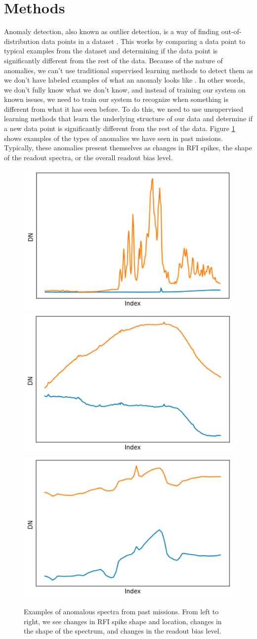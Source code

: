 \section{Methods}
\label{spectra/sec:methods}
Anomaly detection, also known as outlier detection, is a way of finding out-of-distribution data points in a dataset \parencite{kerner2022domain}.
This works by comparing a data point to typical examples from the dataset and determining if the data point is significantly different from the rest of the data.
Because of the nature of anomalies, we can't use traditional supervised learning methods to detect them as we don't have labeled examples of what an anomaly looks like \parencite{horton2021integrating}.
In other words, we don't fully know what we don't know, and instead of training our system on known issues, we need to train our system to recognize when something is different from what it has seen before.
To do this, we need to use unsupervised learning methods that learn the underlying structure of our data and determine if a new data point is significantly different from the rest of the data.
Figure \ref{spectra/fig:examples} shows examples of the types of anomalies we have seen in past missions. 
Typically, these anomalies present themselves as changes in RFI spikes, the shape of the readout spectra, or the overall readout bias level.

\begin{figure}
    \centering
    \includegraphics[width=0.3\linewidth]{figs/spectra/Anom1.png}
    \includegraphics[width=0.3\linewidth]{figs/spectra/anom2.png}
    \includegraphics[width=0.3\linewidth]{figs/spectra/anom3.png}
    \caption[Examples of Anomalous Spectra from Past Missions]{Examples of anomalous spectra from past missions. From left to right, we see changes in RFI spike shape and location, changes in the shape of the spectrum, and changes in the readout bias level.}
    \label{spectra/fig:examples}
\end{figure}

